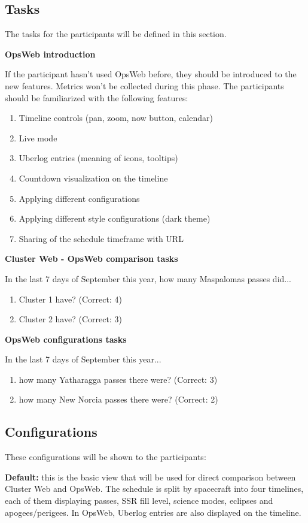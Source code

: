 \subsection{Tasks} \label{tasks_section}
The tasks for the participants will be defined in this section.

\textbf{OpsWeb introduction}

If the participant hasn't used OpsWeb before, they should be introduced to the new features. Metrics won't be collected during this phase. The participants should be familiarized with the following features:
\begin{enumerate}
\item Timeline controls (pan, zoom, now button, calendar)
\item Live mode
\item Uberlog entries (meaning of icons, tooltips)
\item Countdown visualization on the timeline
\item Applying different configurations
\item Applying different style configurations (dark theme)
\item Sharing of the schedule timeframe with URL
\end{enumerate}

\textbf{Cluster Web - OpsWeb comparison tasks}

In the last 7 days of September this year, how many Maspalomas passes did...
\begin{enumerate}
\item Cluster 1 have? (Correct: 4)
\item Cluster 2 have? (Correct: 3)
\end{enumerate}

\textbf{OpsWeb configurations tasks}


In the last 7 days of September this year...
\begin{enumerate}
\item how many Yatharagga passes there were? (Correct: 3)
\item how many New Norcia passes there were? (Correct: 2)
\end{enumerate}

\subsection{Configurations} \label{configurations_section}
These configurations will be shown to the participants:

\textbf{Default:} this is the basic view that will be used for direct comparison between Cluster Web and OpsWeb. The schedule is split by spacecraft into four timelines, each of them displaying passes, SSR fill level, science modes, eclipses and apogees/perigees. In OpsWeb, Uberlog entries are also displayed on the timeline.

